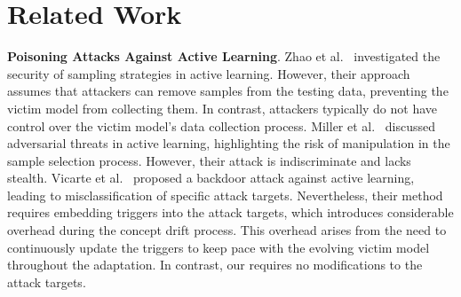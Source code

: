 \section{Related Work}
\label{sec: Related work}
%
\textbf{Poisoning Attacks Against Active Learning}.
Zhao et al.~\cite{zhao2012sampling} investigated the security of sampling strategies in active learning. 
However, their approach assumes that attackers can remove samples from the testing data, preventing the victim model from collecting them. 
In contrast, attackers typically do not have control over the victim model’s data collection process.
Miller et al.~\cite{miller2014adversarial} discussed adversarial threats in active learning, highlighting the risk of manipulation in the sample selection process. However, their attack is indiscriminate and lacks stealth.
Vicarte et al.~\cite{2021-Usenix-active-learning-backdoor} proposed a backdoor attack against active learning, leading to misclassification of specific attack targets.
Nevertheless, their method requires embedding triggers into the attack targets, which introduces considerable overhead during the concept drift process.
This overhead arises from the need to continuously update the triggers to keep pace with the evolving victim model throughout the adaptation.
In contrast, our \pandora requires no modifications to the attack targets.

